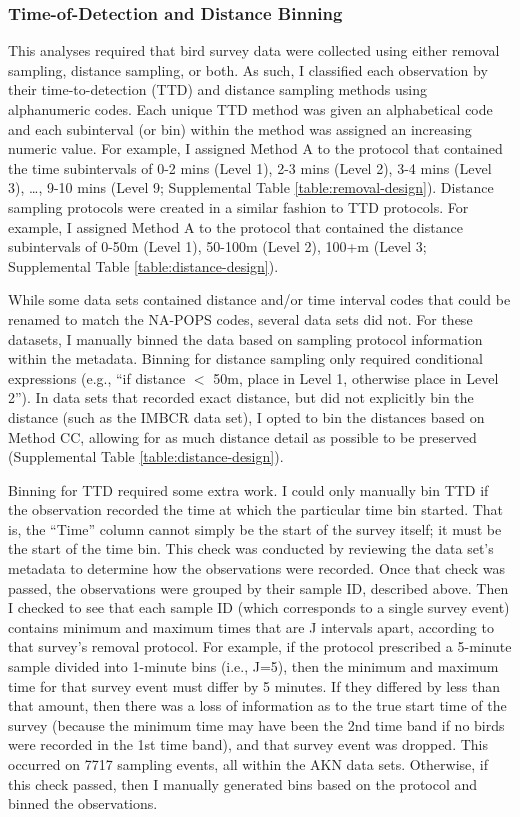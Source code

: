 \subsubsection{Time-of-Detection and Distance Binning}
\par This analyses required that bird survey data were collected using either removal sampling, distance sampling, or both. As such, I classified each observation by their time-to-detection (TTD) and distance sampling methods using alphanumeric codes. Each unique TTD method was given an alphabetical code and each subinterval (or bin) within the method was assigned an increasing numeric value. For example, I assigned Method A to the protocol that contained the time subintervals of 0-2 mins (Level 1), 2-3 mins (Level 2), 3-4 mins (Level 3), …, 9-10 mins (Level 9; Supplemental Table \ref{table:removal-design}). Distance sampling protocols were created in a similar fashion to TTD protocols. For example, I assigned Method A to the protocol that contained the distance subintervals of 0-50m (Level 1), 50-100m (Level 2), 100+m (Level 3; Supplemental Table \ref{table:distance-design}).

\par While some data sets contained distance and/or time interval codes that could be renamed to match the NA-POPS codes, several data sets did not. For these datasets, I manually binned the data based on sampling protocol information within the metadata. Binning for distance sampling only required conditional expressions (e.g., “if distance $<$ 50m, place in Level 1, otherwise place in Level 2”). In data sets that recorded exact distance, but did not explicitly bin the distance (such as the IMBCR data set), I opted to bin the distances based on Method CC, allowing for as much distance detail as possible to be preserved (Supplemental Table \ref{table:distance-design}). 

\par Binning for TTD required some extra work. I could only manually bin TTD if the observation recorded the time at which the particular time bin started. That is, the ``Time” column cannot simply be the start of the survey itself; it must be the start of the time bin. This check was conducted by reviewing the data set’s metadata to determine how the observations were recorded. Once that check was passed, the observations were grouped by their sample ID, described above. Then I checked to see that each sample ID (which corresponds to a single survey event) contains minimum and maximum times that are J intervals apart, according to that survey’s removal protocol. For example, if the protocol prescribed a 5-minute sample divided into 1-minute bins (i.e., J=5), then the minimum and maximum time for that survey event must differ by 5 minutes. If they differed by less than that amount, then there was a loss of information as to the true start time of the survey (because the minimum time may have been the 2nd time band if no birds were recorded in the 1st time band), and that survey event was dropped. This occurred on 7717 sampling events, all within the AKN data sets. Otherwise, if this check passed, then I manually generated bins based on the protocol and binned the observations.

